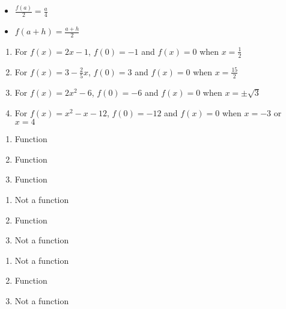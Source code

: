 \documentclass{ximera}
\begin{document}
\begin{enumerate}
\begin{itemize}
 

 

\item $\frac{f(a)}{2} =  \frac{a}{4}$

 

 


\item  $f(a + h) = \frac{a+h}{2}$

\end{itemize}





\end{enumerate}

\begin{enumerate}

\item For $f(x) = 2x-1$,  $f(0) = -1$ and $f(x) = 0$ when $x = \frac{1}{2}$

\item For $f(x) =  3 - \frac{2}{5} x$, $f(0) = 3$ and $f(x) = 0$ when $x = \frac{15}{2}$

\item For $f(x) =  2x^2-6$, $f(0) = -6$ and $f(x) = 0$ when $x = \pm \sqrt{3}$

\item For $f(x) =  x^2-x-12$, $f(0) = -12$ and $f(x) = 0$ when $x = -3$ or $x=4$


\end{enumerate}


\begin{enumerate}


\item Function
\item Function
\item Function

\end{enumerate}


\begin{enumerate}


\item Not a function
\item Function
\item Not a function

\end{enumerate}


\begin{enumerate}

\item  Not a function
\item  Function
\item  Not a function

\end{enumerate}
\end{document}
